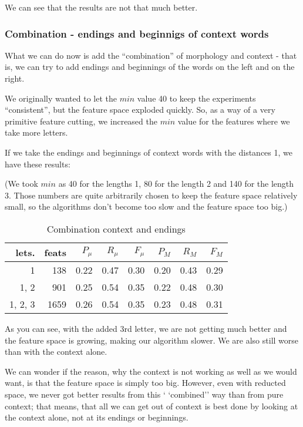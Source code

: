 \documentclass[letterpaper]{article}
\begin{document}
We can see that the results are not that much better.

\subsubsection{Combination - endings and beginnigs of context words}
What we can do now is add the ``combination'' of morphology and context - that is, 
we can try to add endings and beginnings of the words on the left and on the right.

We originally wanted to let the $min$ value 40 to keep the experiments ``consistent'',
but the feature space exploded quickly. So, as a way of a very primitive feature cutting,
we increased the $min$ value for the features where we take more letters.

If we take the endings and beginnings of context words with the distances 1, we have these results:

(We took $min$ as 40 for the lengths 1, 80 for the length 2 and 140 for the length 3. 
Those numbers are quite arbitrarily chosen to keep the feature space relatively small, 
so the algorithms don't become too slow and the feature space too big.)

\begin{table}


\begin{tabular}{|r|r|r|r|r|r|r|r|}
\hline
lets.&feats & $P_\mu$ & $R_\mu$ & $F_\mu$ & $P_M$ & $R_M$  & $F_M$ \\ \hline
1 & 138 & 0.22 & 0.47 & 0.30 & 0.20 & 0.43 & 0.29 \\ \hline
1, 2  & 901 & 0.25 & 0.54 & 0.35 & 0.22 & 0.48 & 0.30 \\ \hline
1, 2, 3  & 1659 & 0.26 & 0.54 & 0.35 & 0.23 & 0.48 & 0.31 \\ \hline

\end{tabular}
\caption{Combination context and endings}
\end{table}
As you can see, with the added 3rd letter, we are not getting much better and 
the feature space is growing, making our algorithm slower. We are also still worse than with the context alone.


We can wonder if the reason, why the context is not working as 
well as we would want, is that the feature space is simply too big. 
However, even with reducted space, we never got better results from this `
`combined'' way than from pure context; that means, that all we can get out of context 
is best done by looking at the context alone, not at its endings or beginnings.
\end{document}
